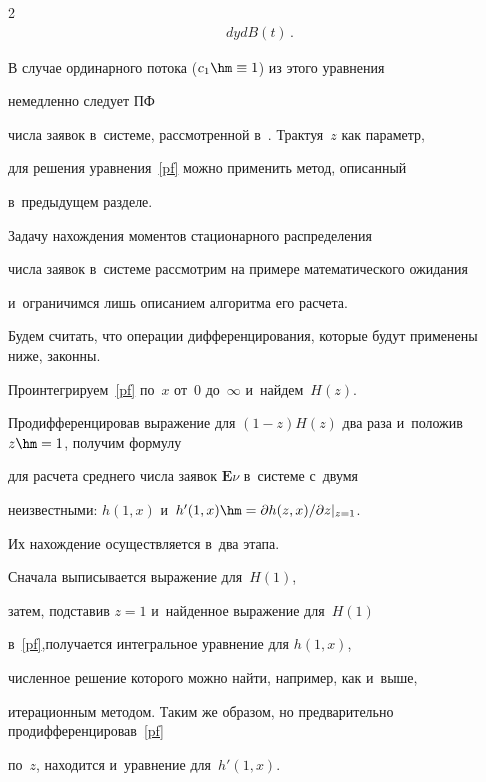 \begin{multicols}{2}
\begin{multline}
dy  dB(t)\,.


\label{pf}


\end{multline}





\noindent В случае ординарного потока ($c_1 \hm\equiv 1$) из этого уравнения 


немедленно следует ПФ


числа заявок в~системе, рассмотренной в~\cite{n3}. Трактуя~$z$ как параметр,


для решения уравнения~\eqref{pf} можно применить метод, описанный 


в~предыдущем разделе.





Задачу нахождения моментов стационарного распределения


числа заявок в~системе рассмотрим на примере математического ожидания


и~ограничимся лишь описанием алгоритма его расчета.





Будем считать, что операции дифференцирования, которые будут применены ниже, законны.


Проинтегрируем~\eqref{pf} по~$x$ от~0 до~$\infty$ и~найдем~$H(z)$.


Продифференцировав выражение для $(1-z)H(z)$ два раза и~положив $z\hm=1$, получим формулу


для расчета среднего числа заявок $\mathbf{E}\nu$ в~системе с~двумя


неизвестными: $h(1,x)$ и~$h'(1,x)\hm=\partial h(z,x) / \partial z |_{z=1}$.


Их нахождение осуществляется в~два этапа.


Сначала выписывается выражение для~$H(1)$,


затем, подставив $z=1$ и~найденное выражение для~$H(1)$


в~\eqref{pf},\linebreak получается интегральное уравнение для $h(1,x)$,


чис\-лен\-ное решение которого можно найти, например, как и~выше,


итерационным методом. Таким же образом, но предварительно продифференцировав~\eqref{pf} 


по~$z$, находится и~уравнение для~$h'(1,x)$.






\end{multicols}
